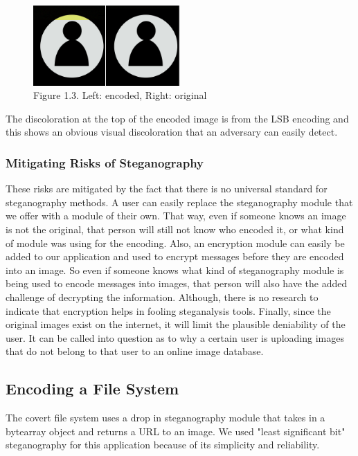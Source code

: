 \begin{figure}[h]
	\includegraphics[width=0.5\textwidth]{comparison}
	\caption{Figure 1.3. Left: encoded, Right: original}
\end{figure}
The discoloration at the top of the encoded image is from the LSB encoding and this shows an obvious visual discoloration that an adversary can easily detect.

\subsubsection{Mitigating Risks of Steganography}
These risks are mitigated by the fact that there is no universal standard for steganography methods. A user can easily replace the steganography module that we offer with a module of their own. That way, even if someone knows an image is not the original, that person will still not know who encoded it, or what kind of module was using for the encoding. Also, an encryption module can easily be added to our application and used to encrypt messages before they are encoded into an image. So even if someone knows what kind of steganography module is being used to encode messages into images, that person will also have the added challenge of decrypting the information. Although, there is no research to indicate that encryption helps in fooling steganalysis tools. Finally, since the original images exist on the internet, it will limit the plausible deniability of the user. It can be called into question as to why a certain user is uploading images that do not belong to that user to an online image database. 

\subsection{Encoding a File System}

The covert file system uses a drop in steganography module that takes in a bytearray object and returns a URL to an image. We used "least significant bit" steganography for this application because of its simplicity and reliability.

